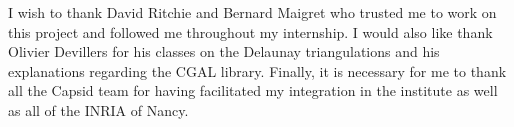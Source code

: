 I wish to thank David Ritchie and Bernard Maigret who trusted me to work on
this project and followed me throughout my internship.
  I would also like thank Olivier Devillers for his classes
  on the Delaunay triangulations and his explanations regarding the CGAL library.
   Finally, it is necessary for me to thank all the Capsid team for having facilitated my
    integration in the institute as well as all of the INRIA of Nancy.
